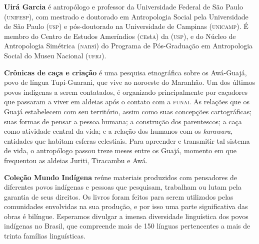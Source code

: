 \textbf{Uirá Garcia} é antropólogo e professor da Universidade Federal de São Paulo \textsc{(unifesp)}, com mestrado e doutorado em Antropologia Social pela Universidade de São Paulo \textsc{(usp)} e pós-doutorado na Universidade de Campinas \textsc{(unicamp)}. 
É membro do Centro de Estudos Ameríndios (\textsc{ce}st\textsc{a}) da \textsc{(usp)}, e do Núcleo de Antropologia Simétrica (\textsc{na}n\textsc{s}i) do Programa de Pós-Graduação em Antropologia Social do Museu Nacional (\textsc{ufrj}). %
	
\textbf{Crônicas de caça e criação} é uma pesquisa etnográfica sobre os Awá-Guajá, povo de língua Tupi-Guarani, que vive ao noroeste do Maranhão. Um dos últimos povos indígenas a serem contatados, é organizado principalmente por caçadores que passaram a viver em aldeias após o contato com a \textsc{funai}. As relações que os Guajá estabelecem com seu território, assim como suas concepções cartográficas; suas formas de pensar a pessoa humana; a construção dos parentescos; a caça como atividade central da vida; e a relação dos humanos com os \emph{karawara}, entidades que habitam esferas celestiais. Para apreender e transmitir tal sistema de vida, o antropólogo passou treze meses entre os Guajá, momento em que frequentou as aldeias Juriti, Tiracambu e Awá.

\textbf{Coleção Mundo Indígena} reúne materiais produzidos com pensadores de diferentes povos indígenas e pessoas que pesquisam, trabalham ou lutam pela garantia de seus direitos. Os livros foram feitos para serem utilizados pelas comunidades envolvidas na sua produção, e por isso uma parte significativa das obras é bilíngue. Esperamos divulgar a imensa diversidade linguística dos povos indígenas no Brasil, que compreende mais de 150 línguas pertencentes a mais de trinta famílias linguísticas.



